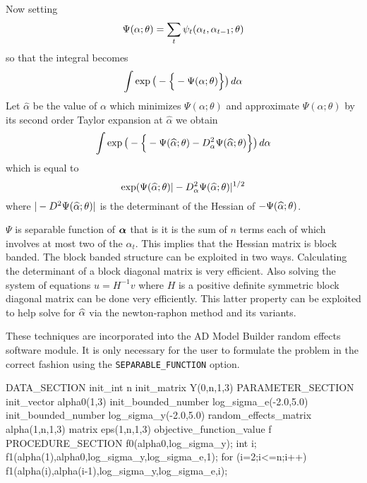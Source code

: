 Now setting 
\begin{equation}
 {
   \Psi(\alpha;\theta)=\sum_t \psi_t(\alpha_t,\alpha_{t-1};\theta)}
    \label{nlss:xx11}
\end{equation}
so that the integral becomes
\begin{equation}
 {
    \int \exp\big( -\Big\{-\Psi(\alpha;\theta)\Big\}\big)\,d\alpha}
    \label{nlss:xx12}
\end{equation}
Let $\widehat\alpha$ be the value of $\alpha$ which minimizes
    $\Psi(\alpha;\theta)$ and approximate $\Psi(\alpha;\theta)$ 
 by its second order Taylor expansion at 
$\widehat\alpha$ we obtain
\begin{equation}
 {
    \int \exp\big( -\Big\{-\Psi(\widehat\alpha;\theta) 
     - D^2_\alpha\Psi(\widehat\alpha;\theta)\Big\}\big)\,d\alpha}
    \label{nlss:xx13}
\end{equation}
which is equal to 
\begin{equation}
\exp(\Psi(\widehat\alpha;\theta)|-D^2_\alpha\Psi(\widehat\alpha;\theta)|^{1/2}
\end{equation}
where $|-D^2\Psi(\widehat\alpha;\theta)|$ is the 
determinant of the Hessian of $-\Psi(\widehat\alpha;\theta)$.

$\Psi$ is separable function of $\boldsymbol{\alpha}$ that is it is
the sum of $n$ terms each of which involves at most two of the $\alpha_t$.
This implies that the Hessian 
matrix is   block banded.  The block banded structure can be 
exploited in two ways. Calculating the determinant of a block diagonal matrix
is very efficient. Also solving the system of equations 
$u=H^{-1}v$ where $H$ is a positive definite symmetric block diagonal matrix
can be done very efficiently. This latter property can be exploited to
help solve for $\widehat\alpha$ via the newton-raphon method and its variants.
 
These techniques are incorporated into the AD Model Builder
random effects software module. It is only necessary for the user to
formulate the problem in the correct fashion using the 
{\tt SEPARABLE\_FUNCTION} option. 

\beginexampledf
DATA_SECTION
  init_int n
  init_matrix Y(0,n,1,3)
PARAMETER_SECTION
  init_vector alpha0(1,3)
  init_bounded_number log_sigma_e(-2.0,5.0)
  init_bounded_number log_sigma_y(-2.0,5.0)
  random_effects_matrix alpha(1,n,1,3)
  matrix eps(1,n,1,3)
  objective_function_value f
PROCEDURE_SECTION
  f0(alpha0,log_sigma_y);
  int i;
  f1(alpha(1),alpha0,log_sigma_y,log_sigma_e,1);
  for (i=2;i<=n;i++)
  {
    f1(alpha(i),alpha(i-1),log_sigma_y,log_sigma_e,i);
  }

